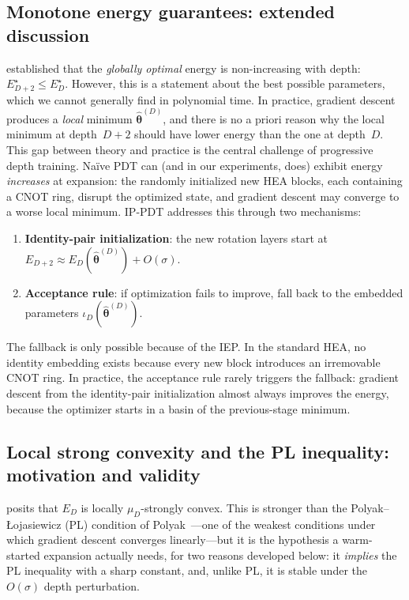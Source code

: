 \documentclass[11pt]{article}
\theoremstyle{plain}
\theoremstyle{plain}
\begin{document}
\subsection{Monotone energy guarantees: extended discussion}
\label{app:monotone_extended}
 established that the \emph{globally
optimal} energy is non-increasing with depth:
$E_{D+2}^\star\le E_D^\star$.  However, this is a statement about
the best possible parameters, which we cannot generally find in
polynomial time.  In practice, gradient descent produces a
\emph{local} minimum $\hat{\bm\theta}^{(D)}$, and there is no a
priori reason why the local minimum at depth~$D{+}2$ should have
lower energy than the one at depth~$D$.
This gap between theory and practice is the central challenge of
progressive depth training.  Na\"ive PDT can (and in our experiments,
does) exhibit energy \emph{increases} at expansion: the randomly
initialized new HEA blocks, each containing a CNOT ring, disrupt
the optimized state, and gradient descent may converge to a worse
local minimum.
IP-PDT addresses this through two mechanisms:
\begin{enumerate}[leftmargin=1.5em]
  \item \textbf{Identity-pair initialization}: the new rotation layers
    start at $E_{D+2}\approx E_D(\hat{\bm\theta}^{(D)})+O(\sigma)$.
  \item \textbf{Acceptance rule}: if optimization fails to improve,
    fall back to the embedded parameters
    $\iota_D(\hat{\bm\theta}^{(D)})$.
\end{enumerate}
The fallback is only possible because of the IEP.  In the standard HEA,
no identity embedding exists because every new block introduces an
irremovable CNOT ring.  In practice, the acceptance rule rarely triggers
the fallback: gradient descent from the identity-pair initialization
almost always improves the energy, because the optimizer starts in a
basin of the previous-stage minimum.
\subsection{Local strong convexity and the PL inequality: motivation and
validity}\label{app:pl_motivation}
 posits that $E_D$ is locally $\mu_D$-strongly
convex.  This is stronger than the Polyak--{\L}ojasiewicz (PL) condition
of Polyak~\cite{polyak1963gradient}---one of the weakest conditions
under which gradient descent converges linearly---but it is the
hypothesis a warm-started expansion actually needs, for two reasons
developed below: it \emph{implies} the PL inequality with a sharp
constant, and, unlike PL, it is stable under the $O(\sigma)$ depth
perturbation.
\end{document}
